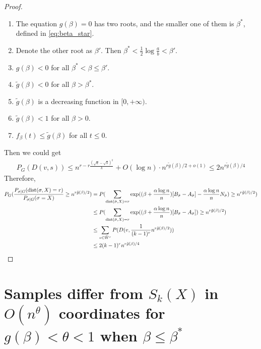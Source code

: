 \documentclass{article}
\begin{document}
\begin{proof}
\begin{lemma}
\begin{enumerate}[label=(\roman*)]
\item The equation $g(\beta) = 0$ has two roots, and the smaller one of them is $\beta^\ast$, defined in \eqref{eq:beta_star}.

\item Denote the other root as $\beta'$. Then
$\beta^\ast< \frac{1}{2}\log\frac{a}{b} <\beta'$.

\item $g(\beta)<0$ for all $\beta^\ast< \beta \le \beta'$.

\item $\tilde{g}(\beta)<0$ for all $\beta>\beta^\ast$.

\item $\tilde{g}(\beta)$ is a decreasing function in $[0,+\infty)$. 

\item $\tilde{g}(\beta)<1$ for all $\beta>0$.

\item $f_{\beta}(t)\le \tilde{g}(\beta)$ for all $t\le 0$.

\end{enumerate}
\end{lemma}
Then we could get
\begin{align*}
P_G( D(v,s)) \leq  n^{r-r\frac{(\sqrt{a}-\sqrt{b})^2}{k}} + O(\log n)  \cdot n^{r\tilde{g}(\beta)/2 + o(1)} \leq 2n^{r\tilde{g}(\beta)/4}
\end{align*}
Therefore,
\begin{align*}
P_G(\frac{P_{\sigma | G}(\operatorname{dist}(\sigma, X) = r)}{P_{\sigma | G}(\sigma = X)} \geq n^{r\tilde{g}(\beta)/2})
&=P(\sum_{\operatorname{dist}(\bar{\sigma}, X)=r} \exp((\beta + \frac{\alpha \log n}{n})[B_{\bar{\sigma}} - A_{\bar{\sigma}}] - \frac{\alpha \log n}{n} N_{\bar{\sigma}}) \geq n^{r\tilde{g}(\beta)/2}) \\
&\leq P(\sum_{\operatorname{dist}(\bar{\sigma}, X)=r} \exp((\beta + \frac{\alpha \log n}{n})[B_{\bar{\sigma}} - A_{\bar{\sigma}}]) \geq n^{r\tilde{g}(\beta)/2}) \\
&\leq \sum_{v \in \bar{W}^r} P(D(v, \frac{1}{(k-1)^r} n^{r\tilde{g}(\beta)/2})) \\
& \leq 2(k-1)^r n^{r\tilde{g}(\beta)/4}
\end{align*}
\end{proof}

\section{Samples differ from $S_k(X)$ in $O(n^{\theta})$ coordinates for $g(\beta)<\theta<1$ when $\beta\le\beta^\ast$}
\label{sect:theta}
\end{document}
